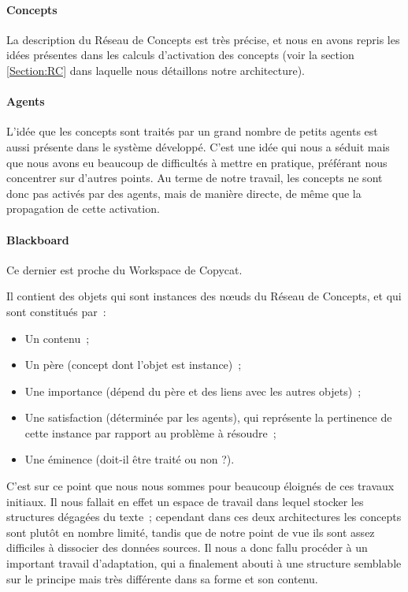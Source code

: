\documentclass[a4paper, 12pt]{article}
\begin{document}
\paragraph{Concepts}
La description du Réseau de Concepts est très précise, et nous en avons repris les idées présentes dans les calculs d'activation des concepts (voir la section \ref{Section:RC} dans laquelle nous détaillons notre architecture).

\paragraph{Agents}
L'idée que les concepts sont traités par un grand nombre de petits agents est aussi présente dans le système développé. C'est une idée qui nous a séduit mais que nous avons eu beaucoup de difficultés à mettre en pratique, préférant nous concentrer sur d'autres points. Au terme de notre travail, les concepts ne sont donc pas activés par des agents, mais de manière directe, de même que la propagation de cette activation.


\paragraph{Blackboard}
Ce dernier est proche du Workspace de Copycat.

Il contient des objets qui sont instances des n\oe{}uds du Réseau de Concepts, et qui sont constitués par~:
\begin{itemize}
 \item Un contenu~;
 \item Un père (concept dont l'objet est instance)~;
 \item Une importance (dépend du père et des liens avec les autres objets)~;
 \item Une satisfaction (déterminée par les agents), qui représente la pertinence de cette instance par rapport au problème à résoudre~;
 \item Une éminence (doit-il être traité ou non ?).
\end{itemize}

C'est sur ce point que nous nous sommes pour beaucoup éloignés de ces travaux initiaux. Il nous fallait en effet un espace de travail dans lequel stocker les structures dégagées du texte~; cependant dans ces deux architectures les concepts sont plutôt en nombre limité, tandis que de notre point de vue ils sont assez difficiles à dissocier des données sources. Il nous a donc fallu procéder à un important travail d'adaptation, qui a finalement abouti à une structure semblable sur le principe mais très différente dans sa forme et son contenu.
\end{document}

